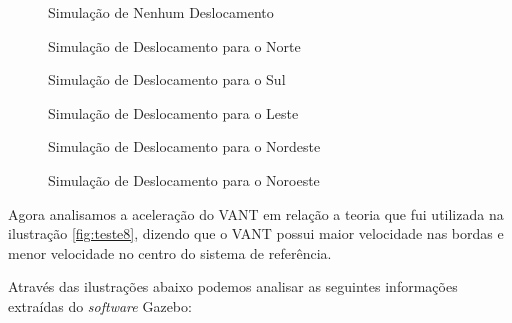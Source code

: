 \begin{figure}[H]
	\centering	
	\caption{Simulação de Nenhum Deslocamento}
	\def\svgwidth{15cm}
	
	\label{fig:00}
\end{figure}
 
\begin{figure}[H]
	\centering	
	\caption{Simulação de Deslocamento para o Norte}
	\def\svgwidth{15cm}
	
	\label{fig:norte}
\end{figure}

\begin{figure}[H]
	\centering	
	\caption{Simulação de Deslocamento para o Sul}
	\def\svgwidth{15cm}
	
	\label{fig:sul}
\end{figure}

\begin{figure}[H]
	\centering	
	\caption{Simulação de Deslocamento para o Leste}
	\def\svgwidth{15cm}
	
	\label{fig:leste}
\end{figure}

\begin{figure}[H]
	\centering	
	\caption{Simulação de Deslocamento para o Nordeste}
	\def\svgwidth{15cm}
	
	\label{fig:nordeste}
\end{figure} 

\begin{figure}[H]
	\centering	
	\caption{Simulação de Deslocamento para o Noroeste}
	\def\svgwidth{15cm}
	
	\label{fig:noroeste}
\end{figure}

Agora analisamos a aceleração do VANT em relação a teoria que fui utilizada na ilustração \ref{fig:teste8}, dizendo que o VANT possui maior velocidade nas bordas e menor velocidade no centro do sistema de referência.

Através das ilustrações abaixo podemos analisar as seguintes informações extraídas do \textit{software} Gazebo:

